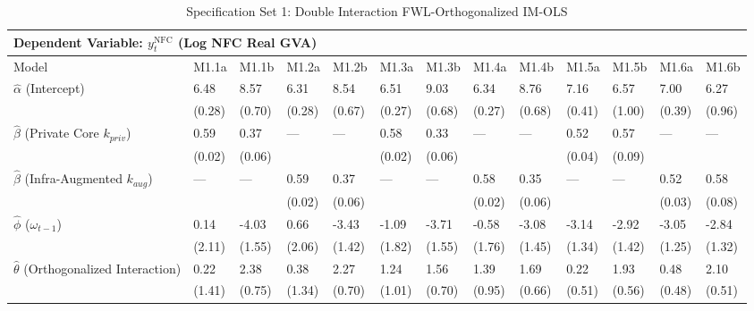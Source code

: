\begin{table}[H]
\centering
\caption{Specification Set 1: Double Interaction FWL-Orthogonalized IM-OLS}
\label{tab:spec_set_1}
\scriptsize
\begin{tabular}{p{3.8cm}p{1.5cm}p{1.5cm}p{1.5cm}p{1.5cm}p{1.5cm}p{1.5cm}p{1.5cm}p{1.5cm}p{1.5cm}p{1.5cm}p{1.5cm}p{1.5cm}}
\toprule
\multicolumn{13}{l}{\textbf{Dependent Variable: $y_t^{\text{NFC}}$ (Log NFC Real GVA)}} \\
\midrule
Model & M1.1a & M1.1b & M1.2a & M1.2b & M1.3a & M1.3b & M1.4a & M1.4b & M1.5a & M1.5b & M1.6a & M1.6b  \\
\midrule
$\hat{\alpha}$ (Intercept)  & 6.48 & 8.57 & 6.31 & 8.54 & 6.51 & 9.03 & 6.34 & 8.76 & 7.16 & 6.57 & 7.00 & 6.27  \\
 & {\scriptsize (0.28)} & {\scriptsize (0.70)} & {\scriptsize (0.28)} & {\scriptsize (0.67)} & {\scriptsize (0.27)} & {\scriptsize (0.68)} & {\scriptsize (0.27)} & {\scriptsize (0.68)} & {\scriptsize (0.41)} & {\scriptsize (1.00)} & {\scriptsize (0.39)} & {\scriptsize (0.96)}  \\
$\hat{\beta}$ (Private Core $k_{priv}$)  & 0.59 & 0.37 & --- & --- & 0.58 & 0.33 & --- & --- & 0.52 & 0.57 & --- & ---  \\
 & {\scriptsize (0.02)} & {\scriptsize (0.06)} &  &  & {\scriptsize (0.02)} & {\scriptsize (0.06)} &  &  & {\scriptsize (0.04)} & {\scriptsize (0.09)} &  &   \\
$\hat{\beta}$ (Infra-Augmented $k_{aug}$)  & --- & --- & 0.59 & 0.37 & --- & --- & 0.58 & 0.35 & --- & --- & 0.52 & 0.58  \\
 &  &  & {\scriptsize (0.02)} & {\scriptsize (0.06)} &  &  & {\scriptsize (0.02)} & {\scriptsize (0.06)} &  &  & {\scriptsize (0.03)} & {\scriptsize (0.08)}  \\
$\hat{\phi}$ ($\omega_{t-1}$)  & 0.14 & -4.03 & 0.66 & -3.43 & -1.09 & -3.71 & -0.58 & -3.08 & -3.14 & -2.92 & -3.05 & -2.84  \\
 & {\scriptsize (2.11)} & {\scriptsize (1.55)} & {\scriptsize (2.06)} & {\scriptsize (1.42)} & {\scriptsize (1.82)} & {\scriptsize (1.55)} & {\scriptsize (1.76)} & {\scriptsize (1.45)} & {\scriptsize (1.34)} & {\scriptsize (1.42)} & {\scriptsize (1.25)} & {\scriptsize (1.32)}  \\
$\hat{\theta}$ (Orthogonalized Interaction)  & 0.22 & 2.38 & 0.38 & 2.27 & 1.24 & 1.56 & 1.39 & 1.69 & 0.22 & 1.93 & 0.48 & 2.10  \\
 & {\scriptsize (1.41)} & {\scriptsize (0.75)} & {\scriptsize (1.34)} & {\scriptsize (0.70)} & {\scriptsize (1.01)} & {\scriptsize (0.70)} & {\scriptsize (0.95)} & {\scriptsize (0.66)} & {\scriptsize (0.51)} & {\scriptsize (0.56)} & {\scriptsize (0.48)} & {\scriptsize (0.51)}  \\

\end{tabular}
\end{table}
